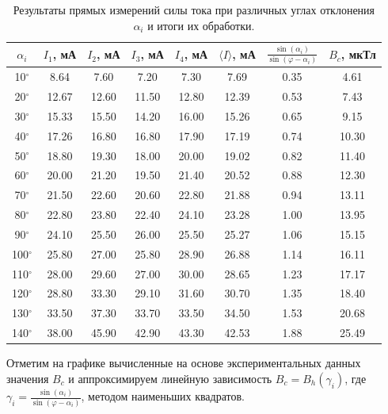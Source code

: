 \documentclass[12pt, a4paper]{article}
\begin{document}
\begin{table}[H]
\begin{center}
\begin{tabular}{|c|c|c|c|c|c|c|c|}
\hline 
$\alpha_i$ & $I_1$, мА & $I_2$, мА & $I_3$, мА & $I_4$, мА & $\langle I \rangle$, мА & $\frac{\sin(\alpha_i)}{\sin(\varphi - \alpha_i)}$ & $B_c$, мкТл \\ 
\hline 
10$^{\circ}$ & 8.64 & 7.60 & 7.20 & 7.30 & 7.69& 0.35 & 4.61\\ 
\hline 
20$^{\circ}$ & 12.67 & 12.60 & 11.50 & 12.80 & 12.39& 0.53 & 7.43\\ 
\hline 
30$^{\circ}$ & 15.33 & 15.50 & 14.20 & 16.00 & 15.26& 0.65 & 9.15\\ 
\hline 
40$^{\circ}$ & 17.26 & 16.80 & 16.80 & 17.90 & 17.19& 0.74 & 10.30\\ 
\hline 
50$^{\circ}$ & 18.80 & 19.30 & 18.00 & 20.00 & 19.02& 0.82 & 11.40\\ 
\hline 
60$^{\circ}$ & 20.00 & 21.20 & 19.50 & 21.40 & 20.52& 0.88 & 12.30\\ 
\hline 
70$^{\circ}$ & 21.50 & 22.60 & 20.60 & 22.80 & 21.88& 0.94 & 13.11\\ 
\hline 
80$^{\circ}$ & 22.80 & 23.80 & 22.40 & 24.10 & 23.28& 1.00 & 13.95\\ 
\hline 
90$^{\circ}$ & 24.10 & 25.50 & 26.00 & 25.50 & 25.27& 1.06 & 15.15\\ 
\hline 
100$^{\circ}$ & 25.80 & 27.00 & 25.80 & 28.90 & 26.88& 1.14 & 16.11\\ 
\hline 
110$^{\circ}$ & 28.00 & 29.60 & 27.00 & 30.00 & 28.65& 1.23 & 17.17\\ 
\hline 
120$^{\circ}$ & 28.80 & 33.30 & 29.10 & 31.60 & 30.70& 1.35 & 18.40\\ 
\hline 
130$^{\circ}$ & 33.50 & 37.30 & 33.70 & 33.50 & 34.50& 1.53 & 20.68\\ 
\hline 
140$^{\circ}$ & 38.00 & 45.90 & 42.90 & 43.30 & 42.53& 1.88 & 25.49\\ 
\hline 




\end{tabular}
\caption{Результаты прямых измерений силы тока при различных углах отклонения $\alpha_i$ и итоги их обработки.}
\label{tab:1}
\end{center}
\end{table}

Отметим на графике вычисленные на основе экспериментальных данных значения $B_c$ и аппроксимируем линейную зависимость $B_c=B_h (\gamma_i)$, где $\gamma_i = \frac{\sin(\alpha_i)}{\sin(\varphi - \alpha_i)}$, методом наименьших квадратов.
\end{document}

